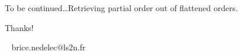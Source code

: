 \documentclass[10pt, xcolor={usenames, dvipsnames}]{beamer}
\begin{document}
\begin{frame}[standout]

  To be continued\ldots Retrieving partial order out of flattened orders.
  
  \vspace{2em}
  
  \begin{center}
    
  \end{center}
  
\end{frame}


\begin{frame}[standout]

  \vspace{6em}
  
  Thanks!

  \vspace{5em}

  \small
  \faEnvelope ~ brice.nedelec@ls2n.fr

\end{frame}
\end{document}
